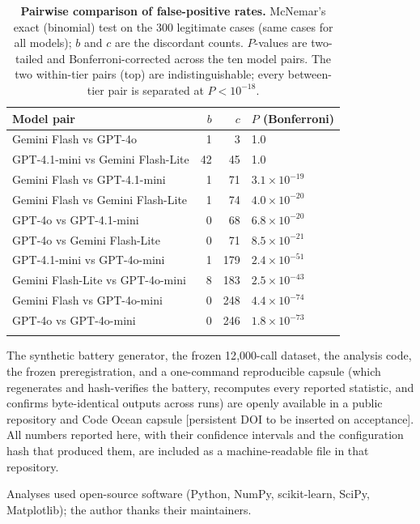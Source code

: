 \documentclass[lineno,pdflatex,sn-basic,Numbered]{sn-jnl}
\begin{document}
\begin{table}[t]
\caption{\textbf{Pairwise comparison of false-positive rates.} McNemar's exact (binomial) test on the 300 legitimate cases (same cases for all models); $b$ and $c$ are the discordant counts. $P$-values are two-tailed and Bonferroni-corrected across the ten model pairs. The two within-tier pairs (top) are indistinguishable; every between-tier pair is separated at $P<10^{-18}$.}\label{tab:mcnemar}
\begin{tabular}{@{}lrrl@{}}
\toprule
Model pair & $b$ & $c$ & $P$ (Bonferroni) \\
\midrule
Gemini Flash vs GPT-4o                & 1 & 3   & 1.0 \\
GPT-4.1-mini vs Gemini Flash-Lite     & 42 & 45 & 1.0 \\
Gemini Flash vs GPT-4.1-mini          & 1 & 71  & $3.1\times10^{-19}$ \\
Gemini Flash vs Gemini Flash-Lite     & 1 & 74  & $4.0\times10^{-20}$ \\
GPT-4o vs GPT-4.1-mini                 & 0 & 68  & $6.8\times10^{-20}$ \\
GPT-4o vs Gemini Flash-Lite            & 0 & 71  & $8.5\times10^{-21}$ \\
GPT-4.1-mini vs GPT-4o-mini            & 1 & 179 & $2.4\times10^{-51}$ \\
Gemini Flash-Lite vs GPT-4o-mini       & 8 & 183 & $2.5\times10^{-43}$ \\
Gemini Flash vs GPT-4o-mini            & 0 & 248 & $4.4\times10^{-74}$ \\
GPT-4o vs GPT-4o-mini                  & 0 & 246 & $1.8\times10^{-73}$ \\
\botrule
\end{tabular}
\end{table}

\backmatter

The synthetic battery generator, the frozen 12{,}000-call dataset, the analysis code, the frozen preregistration, and a one-command reproducible capsule (which regenerates and hash-verifies the battery, recomputes every reported statistic, and confirms byte-identical outputs across runs) are openly available in a public repository and Code Ocean capsule [persistent DOI to be inserted on acceptance]. All numbers reported here, with their confidence intervals and the configuration hash that produced them, are included as a machine-readable file in that repository.

Analyses used open-source software (Python, NumPy, scikit-learn, SciPy, Matplotlib); the author thanks their maintainers.
\end{document}

